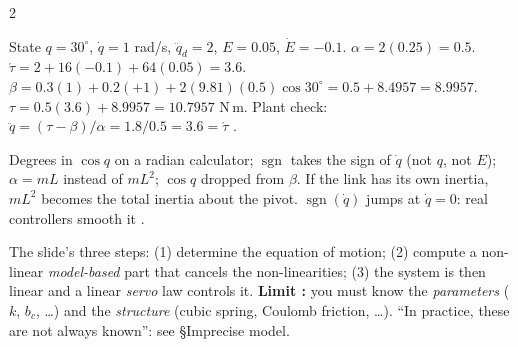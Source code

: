 \begin{multicols}{2}
\begin{worked}[$m=2$, $L=0.5$, $b_v=0.3$, $b_c=0.2$, $k_p=64$, $k_v=16$; radians]
State $q=30^\circ$, $\dot q=1$ rad/s, $\ddot q_d=2$, $E=0.05$, $\dot E=-0.1$. $\alpha=2(0.25)=0.5$. $\acute\tau=2+16(-0.1)+64(0.05)=3.6$. $\beta=0.3(1)+0.2(+1)+2(9.81)(0.5)\cos30^\circ=0.5+8.4957=8.9957$. $\tau=0.5(3.6)+8.9957=10.7957$ N\,m. Plant check: $\ddot q=(\tau-\beta)/\alpha=1.8/0.5=3.6=\acute\tau$ \checkmark. \chk
\end{worked}
\begin{trap}
Degrees in $\cos q$ on a radian calculator; $\operatorname{sgn}$ takes the sign of $\dot q$ (not $q$, not $E$); $\alpha=mL$ instead of $mL^2$; $\cos q$ dropped from $\beta$. If the link has its own inertia, $mL^2$ becomes the total inertia about the pivot. $\operatorname{sgn}(\dot q)$ jumps at $\dot q=0$: real controllers smooth it \added.
\end{trap}

The slide's three steps: (1) determine the equation of motion; (2) compute a non-linear \emph{model-based} part that cancels the non-linearities; (3) the system is then linear and a linear \emph{servo} law controls it. \textbf{Limit :} you must know the \emph{parameters} ($k$, $b_c$, \dots) and the \emph{structure} (cubic spring, Coulomb friction, \dots). ``In practice, these are not always known'': see \S Imprecise model.


\end{multicols}

